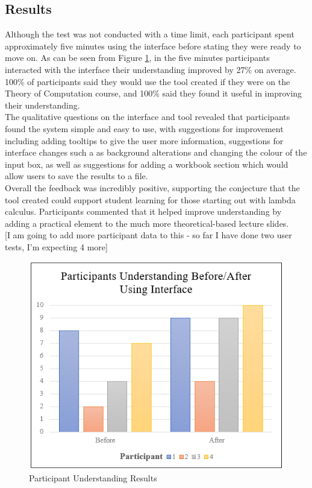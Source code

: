 \documentclass[a4paper,12pt]{report}
\begin{document}
\subsection{Results}
Although the test was not conducted with a time limit, each participant spent approximately five minutes using the interface before stating they were ready to move on. As can be seen from Figure \ref{participant_understanding}, in the five minutes participants interacted with the interface their understanding improved by 27\% on average. 100\% of participants said they would use the tool created if they were on the Theory of Computation course, and 100\% said they found it useful in improving their understanding.\\

The qualitative questions on the interface and tool revealed that participants found the system simple and easy to use, with suggestions for improvement including adding tooltips to give the user more information, suggestions for interface changes such a as background alterations and changing the colour of the input box, as well as suggestions for adding a workbook section which would allow users to save the results to a file.\\

Overall the feedback was incredibly positive, supporting the conjecture that the tool created could support student learning for those starting out with lambda calculus. Participants commented that it helped improve understanding by adding a practical element to the much more theoretical-based lecture slides.\\

[I am going to add more participant data to this - so far I have done two user tests, I'm expecting 4 more]


\begin{figure}[h]
	\includegraphics{images/participant_understanding}
	\centering
	\caption{Participant Understanding Results}
	\label{participant_understanding}
\end{figure}
\end{document}
